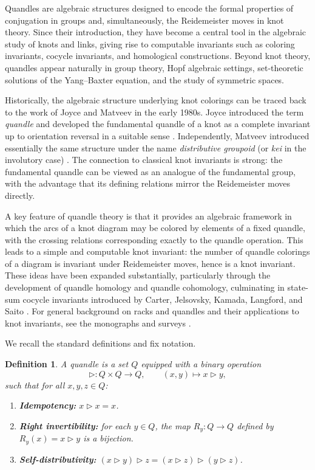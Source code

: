 \documentclass[english,11pt]{amsart}
\newtheorem{Def}[Theorem]{Definition}
\begin{document}
\bigskip

Quandles are algebraic structures designed to encode the formal properties of conjugation in groups and, simultaneously, the Reidemeister moves in knot theory. Since their introduction, they have become a central tool in the algebraic study of knots and links, giving rise to computable invariants such as coloring invariants, cocycle invariants, and homological constructions. Beyond knot theory, quandles appear naturally in group theory, Hopf algebraic settings, set-theoretic solutions of the Yang--Baxter equation, and the study of symmetric spaces.

Historically, the algebraic structure underlying knot colorings can be traced back to the work of Joyce and Matveev in the early 1980s. Joyce introduced the term \emph{quandle} and developed the fundamental quandle of a knot as a complete invariant up to orientation reversal in a suitable sense \cite{Joyce82}. Independently, Matveev introduced essentially the same structure under the name \emph{distributive groupoid} (or \emph{kei} in the involutory case) \cite{Matveev82}. The connection to classical knot invariants is strong: the fundamental quandle can be viewed as an analogue of the fundamental group, with the advantage that its defining relations mirror the Reidemeister moves directly.

A key feature of quandle theory is that it provides an algebraic framework in which the arcs of a knot diagram may be colored by elements of a fixed quandle, with the crossing relations corresponding exactly to the quandle operation. This leads to a simple and computable knot invariant: the number of quandle colorings of a diagram is invariant under Reidemeister moves, hence is a knot invariant. These ideas have been expanded substantially, particularly through the development of quandle homology and quandle cohomology, culminating in state-sum cocycle invariants introduced by Carter, Jelsovsky, Kamada, Langford, and Saito \cite{CarterEtAl99,CarterEtAl03}. For general background on racks and quandles and their applications to knot invariants, see the monographs and surveys \cite{ElhamdadiNelson15,Kamanda17}.

We recall the standard definitions and fix notation. 

\begin{Def}
A \emph{quandle} is a set $Q$ equipped with a binary operation
\[
\rhd \colon Q \times Q \to Q,\qquad (x,y)\mapsto x \rhd y,
\]
such that for all $x,y,z \in Q$:
\begin{enumerate}
  \item \textbf{Idempotency:} $x \rhd x = x$.
  \item \textbf{Right invertibility:} for each $y\in Q$, the map $R_y\colon Q\to Q$ defined by $R_y(x)=x\rhd y$ is a bijection.
  \item \textbf{Self-distributivity:} $(x\rhd y)\rhd z = (x\rhd z)\rhd (y\rhd z)$.
\end{enumerate}
\end{Def}
\end{document}
